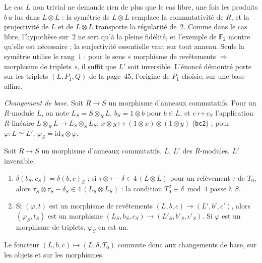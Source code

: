 \begin{remarque}
Le cas $L$ non trivial ne demande rien de plus que le cas libre, une fois les produits $b\,u$ lus dans $L \otimes L$ : la symétrie de $L \otimes L$ remplace la commutativité de $R$, et la projectivité de $L$ et de $L \otimes L$ transporte la régularité de~$2$. Comme dans le cas libre, l'hypothèse sur~$2$ ne sert qu'à la pleine fidélité, et l'exemple de $\mathbb F_2$ montre qu'elle est nécessaire ; la surjectivité essentielle vaut sur tout anneau. Seule la symétrie utilise le rang~$1$ : pour le sens « morphisme de revêtements $\Rightarrow$ morphisme de triplets », il suffit que $L'$ soit inversible. L'énoncé démontré porte sur les triplets $(L, P_1, Q)$ de la page~45, l'origine de $P_1$ choisie, sur une base affine.
\end{remarque}

\noindent\emph{Changement de base.} Soit $R \to S$ un morphisme d'anneaux commutatifs. Pour un $R$-module $L$, on note $L_S = S \otimes_R L$, $b_S = 1 \otimes b$ pour $b \in L$, et $c \mapsto c_S$ l'application $R$-linéaire $L \otimes_R L \to L_S \otimes_S L_S$, $x \otimes y \mapsto (1 \otimes x) \otimes (1 \otimes y)$ (\texttt{bc2}) ; pour $\varphi : L \simeq L'$, $\varphi_S = \mathrm{id}_S \otimes \varphi$.

\begin{enonce}
Soit $R \to S$ un morphisme d'anneaux commutatifs, $L$, $L'$ des $R$-modules, $L'$ inversible.
\begin{enumerate}
\item $\delta(b_S, c_S) = \delta(b, c)_S$ ; si $\tau \otimes \tau - \delta \in 4\,(L \otimes L)$ pour un relèvement $\tau$ de $T_0$, alors $\tau_S \otimes \tau_S - \delta_S \in 4\,(L_S \otimes L_S)$ : la condition $T_0^2 \equiv \delta \bmod 4$ passe à $S$.
\item Si $(\varphi, t)$ est un morphisme de revêtements $(L, b, c) \to (L', b', c')$, alors $(\varphi_S, t_S)$ est un morphisme $(L_S, b_S, c_S) \to (L'_S, b'_S, c'_S)$. Si $\varphi$ est un morphisme de triplets, $\varphi_S$ en est un.
\end{enumerate}
Le foncteur $(L, b, c) \mapsto (L, \delta, T_0)$ commute donc aux changements de base, sur les objets et sur les morphismes.
\end{enonce}

